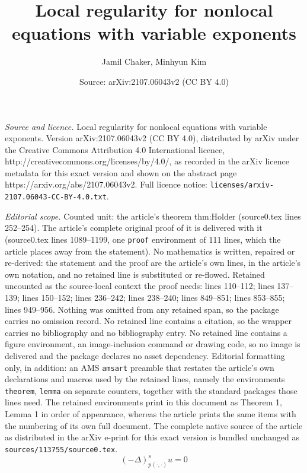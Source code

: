 \documentclass[10pt,a4paper]{amsart}
\title{Local regularity for nonlocal equations with variable exponents}
\author{Jamil Chaker, Minhyun Kim}
\date{Source: arXiv:2107.06043v2 (CC BY 4.0)}
\begin{document}
\maketitle

\noindent\emph{Source and licence.} Local regularity for nonlocal equations with variable exponents. Version arXiv:2107.06043v2 (CC BY 4.0), distributed by arXiv under the Creative Commons Attribution 4.0 International licence, http://creativecommons.org/licenses/by/4.0/, as recorded in the arXiv licence metadata for this exact version and shown on the abstract page https://arxiv.org/abs/2107.06043v2. Full licence notice: \texttt{licenses/arxiv-2107.06043-CC-BY-4.0.txt}.\par\smallskip

\noindent\textit{Editorial scope.} Counted unit: the article's theorem thm:Holder (source0.tex lines 252--254). The article's complete original proof of it is delivered with it (source0.tex lines 1089--1199, one \texttt{proof} environment of 111 lines, which the article places away from the statement). No mathematics is written, repaired or re-derived: the statement and the proof are the article's own lines, in the article's own notation, and no retained line is substituted or re-flowed.  Retained uncounted as the source-local context the proof needs: lines 110--112; lines 137--139; lines 150--152; lines 236--242; lines 238--240; lines 849--851; lines 853--855; lines 949--956.  Nothing was omitted from any retained span, so the package carries no omission record.  No retained line contains a citation, so the wrapper carries no bibliography and no bibliography entry.  No retained line contains a figure environment, an image-inclusion command or drawing code, so no image is delivered and the package declares no asset dependency.  Editorial formatting only, in addition: an AMS \texttt{amsart} preamble that restates the article's own declarations and macros used by the retained lines, namely the environments \texttt{theorem}, \texttt{lemma} on separate counters, together with the standard packages those lines need.  The retained environments print in this document as Theorem 1, Lemma 1 in order of appearance, whereas the article prints the same items with the numbering of its own full document.  The complete native source of the article as distributed in the arXiv e-print for this exact version is bundled unchanged as \texttt{sources/113755/source0.tex}.
\begin{equation} \label{eq:EL}
(-\Delta)^s_{p(\cdot,\cdot)}u = 0
\end{equation}
\end{document}
